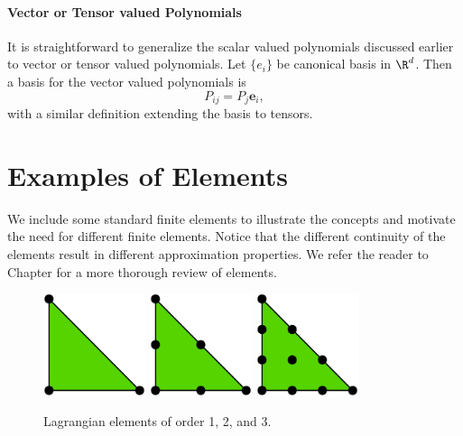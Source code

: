 \paragraph{Vector or Tensor valued Polynomials}
It is straightforward to generalize the scalar valued polynomials discussed
earlier to vector or tensor valued polynomials. Let $\{e_i\}$ be canonical
basis in $\R^d$. Then a basis for the vector valued polynomials is
\[
P_{ij} = P_j \mathbf{e}_i,
\]
with a similar definition extending the basis to tensors.


\section{Examples of Elements}

We include some standard finite elements to illustrate the concepts and
motivate the need for different finite elements. Notice
that the different continuity of the elements result in
different approximation properties.
We refer the reader to Chapter \cite{missing} for a more thorough review of
elements.

\begin{figure}
  \begin{center}
    \includegraphics[height=3cm]{chapters/kirby-6/pdf/P1.pdf} \hspace{1.0cm}
    \includegraphics[height=3cm]{chapters/kirby-6/pdf/P2.pdf} \hspace{1.0cm}
    \includegraphics[height=3cm]{chapters/kirby-6/pdf/P3.pdf}
    \caption{Lagrangian elements of order 1, 2, and 3.}
    \label{Lagrange}
  \end{center}
\end{figure}

